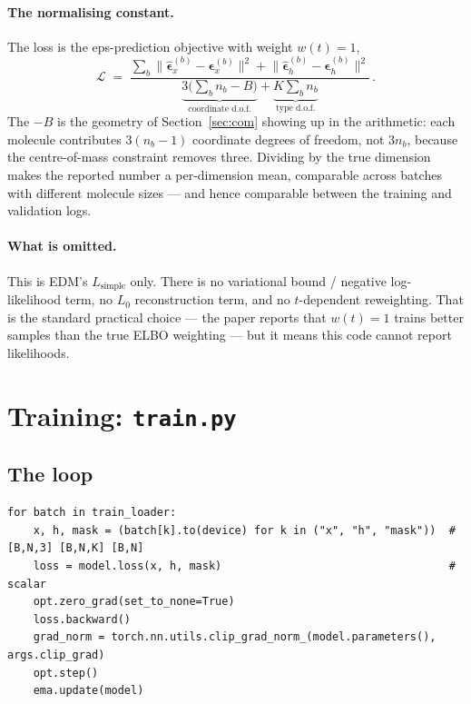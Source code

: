 \documentclass[11pt,a4paper]{article}
\newcommand{\bm}{\boldsymbol{\epsilon}}
\newcommand{\file}[1]{\textcolor{BlueLink}{\texttt{#1}}}
\begin{document}
\paragraph{The normalising constant.} The loss is the eps-prediction objective
with weight $w(t)=1$,
\begin{equation}
  \mathcal{L} \;=\;
  \frac{\sum_b \bigl\lVert \hat{\bm}_x^{(b)} - \bm_x^{(b)} \bigr\rVert^2
      + \bigl\lVert \hat{\bm}_h^{(b)} - \bm_h^{(b)} \bigr\rVert^2}
       {\underbrace{3\bigl(\textstyle\sum_b n_b - B\bigr)}_{\text{coordinate d.o.f.}}
      + \underbrace{K\textstyle\sum_b n_b}_{\text{type d.o.f.}}}\,.
\end{equation}
The $-B$ is the geometry of Section~\ref{sec:com} showing up in the arithmetic:
each molecule contributes $3(n_b-1)$ coordinate degrees of freedom, not $3n_b$,
because the centre-of-mass constraint removes three. Dividing by the true
dimension makes the reported number a per-dimension mean, comparable across
batches with different molecule sizes --- and hence comparable between the
training and validation logs.

\paragraph{What is omitted.} This is EDM's $L_{\text{simple}}$ only. There is no
variational bound / negative log-likelihood term, no $L_0$ reconstruction term,
and no $t$-dependent reweighting. That is the standard practical choice --- the
paper reports that $w(t)=1$ trains better samples than the true ELBO weighting ---
but it means this code cannot report likelihoods.

\section{Training: \file{train.py}}

\subsection{The loop}

\begin{lstlisting}[caption={The inner training step}]
for batch in train_loader:
    x, h, mask = (batch[k].to(device) for k in ("x", "h", "mask"))  # [B,N,3] [B,N,K] [B,N]
    loss = model.loss(x, h, mask)                                   # scalar
    opt.zero_grad(set_to_none=True)
    loss.backward()
    grad_norm = torch.nn.utils.clip_grad_norm_(model.parameters(), args.clip_grad)
    opt.step()
    ema.update(model)
\end{lstlisting}
\end{document}
